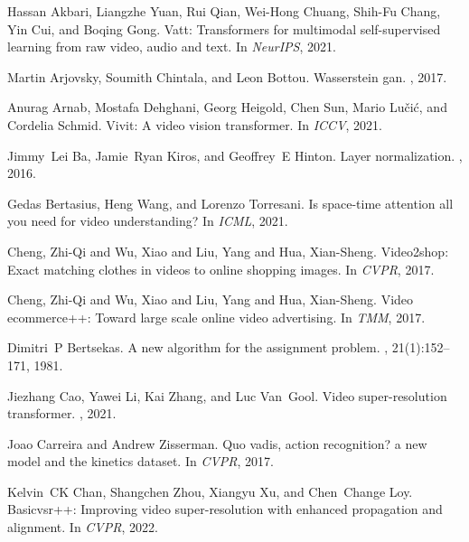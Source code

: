 \documentclass[10pt,twocolumn,letterpaper]{article}
\begin{document}
{\small

\begin{thebibliography}{10}\itemsep=-1pt

Hassan Akbari, Liangzhe Yuan, Rui Qian, Wei-Hong Chuang, Shih-Fu Chang, Yin
  Cui, and Boqing Gong.
\newblock Vatt: Transformers for multimodal self-supervised learning from raw
  video, audio and text.
\newblock In {\em NeurIPS}, 2021.

Martin Arjovsky, Soumith Chintala, and Leon Bottou.
\newblock Wasserstein gan.
, 2017.

Anurag Arnab, Mostafa Dehghani, Georg Heigold, Chen Sun, Mario Lu{\v{c}}i{\'c},
  and Cordelia Schmid.
\newblock Vivit: A video vision transformer.
\newblock In {\em ICCV}, 2021.

Jimmy~Lei Ba, Jamie~Ryan Kiros, and Geoffrey~E Hinton.
\newblock Layer normalization.
, 2016.

Gedas Bertasius, Heng Wang, and Lorenzo Torresani.
\newblock Is space-time attention all you need for video understanding?
\newblock In {\em ICML}, 2021.

Cheng, Zhi-Qi and Wu, Xiao and Liu, Yang and Hua, Xian-Sheng.
\newblock Video2shop: Exact matching clothes in videos to online shopping images.
\newblock In {\em CVPR}, 2017.

Cheng, Zhi-Qi and Wu, Xiao and Liu, Yang and Hua, Xian-Sheng.
\newblock Video ecommerce++: Toward large scale online video advertising.
\newblock In {\em TMM}, 2017.

Dimitri~P Bertsekas.
\newblock A new algorithm for the assignment problem.
, 21(1):152--171, 1981.

Jiezhang Cao, Yawei Li, Kai Zhang, and Luc Van~Gool.
\newblock Video super-resolution transformer.
, 2021.

Joao Carreira and Andrew Zisserman.
\newblock Quo vadis, action recognition? a new model and the kinetics dataset.
\newblock In {\em CVPR}, 2017.

Kelvin~CK Chan, Shangchen Zhou, Xiangyu Xu, and Chen~Change Loy.
\newblock Basicvsr++: Improving video super-resolution with enhanced
  propagation and alignment.
\newblock In {\em CVPR}, 2022.


\end{thebibliography}}
\end{document}
